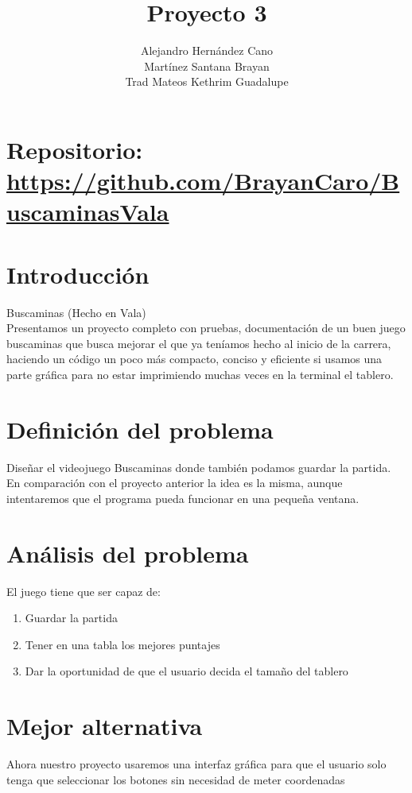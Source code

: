 \documentclass{article}
\title{Proyecto 3}
\author{Alejandro Hernández Cano\\
    Martínez Santana Brayan\\
    Trad Mateos Kethrim Guadalupe}
\begin{document}
    \maketitle
    \section*{Repositorio: \url{https://github.com/BrayanCaro/BuscaminasVala}}

    \section{Introducción}
    Buscaminas (Hecho en Vala)\\
    Presentamos un proyecto completo con pruebas, documentación de un buen juego buscaminas que busca mejorar el que ya teníamos hecho al inicio de la carrera, haciendo un código un poco más compacto, conciso y eficiente si usamos una parte gráfica para no estar imprimiendo muchas veces en la terminal el tablero.

    \section{Definición del problema}
    Diseñar el videojuego Buscaminas donde también podamos guardar la partida.\\
    En comparación con el proyecto anterior la idea es la misma, aunque intentaremos que el programa pueda funcionar en una pequeña ventana.

    \section{Análisis del problema}
    El juego tiene que ser capaz de:
    \begin{enumerate}
        \item Guardar la partida
        \item Tener en una tabla los mejores puntajes
        \item Dar la oportunidad de que el usuario decida el tamaño del tablero
    \end{enumerate}

    \section{Mejor alternativa}
    Ahora nuestro proyecto usaremos una interfaz gráfica para que el usuario solo tenga que seleccionar los botones sin necesidad de meter coordenadas
\end{document}
